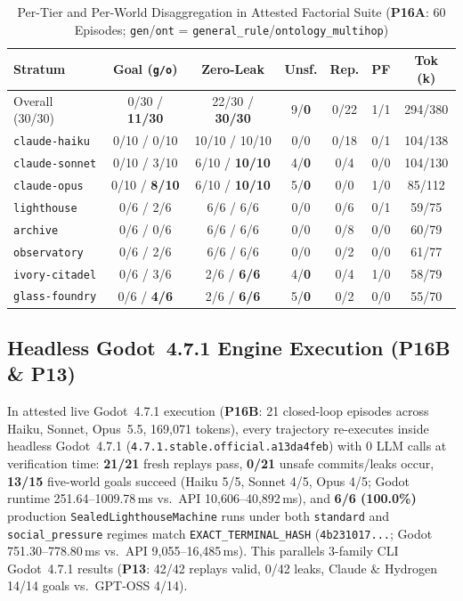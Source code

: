\begin{table}[!tbp]
\caption{Per-Tier and Per-World Disaggregation in Attested Factorial Suite (\textbf{P16A}: 60 Episodes; \texttt{gen}/\texttt{ont} = \texttt{general\_rule}/\texttt{ontology\_multihop})}
\label{tab:kbs-p16a}
\centering
\scriptsize
\setlength{\tabcolsep}{1.5pt}
\begin{tabularx}{\columnwidth}{@{}>{\raggedright\arraybackslash}X*{6}{c}@{}}
\toprule
\textbf{Stratum} & \textbf{Goal (\texttt{g/o})} & \textbf{Zero-Leak} & \textbf{Unsf.} & \textbf{Rep.} & \textbf{PF} & \textbf{Tok (k)} \\
\midrule
Overall (30/30) & 0/30 / \textbf{11/30} & 22/30 / \textbf{30/30} & 9/\textbf{0} & 0/22 & 1/1 & 294/380 \\
\texttt{claude-haiku} & 0/10 / 0/10 & 10/10 / 10/10 & 0/0 & 0/18 & 0/1 & 104/138 \\
\texttt{claude-sonnet} & 0/10 / 3/10 & 6/10 / \textbf{10/10} & 4/\textbf{0} & 0/4 & 0/0 & 104/130 \\
\texttt{claude-opus} & 0/10 / \textbf{8/10} & 6/10 / \textbf{10/10} & 5/\textbf{0} & 0/0 & 1/0 & 85/112 \\
\midrule
\texttt{lighthouse} & 0/6 / 2/6 & 6/6 / 6/6 & 0/0 & 0/6 & 0/1 & 59/75 \\
\texttt{archive} & 0/6 / 0/6 & 6/6 / 6/6 & 0/0 & 0/8 & 0/0 & 60/79 \\
\texttt{observatory} & 0/6 / 2/6 & 6/6 / 6/6 & 0/0 & 0/2 & 0/0 & 61/77 \\
\texttt{ivory-citadel} & 0/6 / 3/6 & 2/6 / \textbf{6/6} & 4/\textbf{0} & 0/4 & 1/0 & 58/79 \\
\texttt{glass-foundry} & 0/6 / \textbf{4/6} & 2/6 / \textbf{6/6} & 5/\textbf{0} & 0/2 & 0/0 & 55/70 \\
\bottomrule
\end{tabularx}
\end{table}

\subsection{Headless Godot~4.7.1 Engine Execution (\textbf{P16B} \& \textbf{P13})}
In attested live Godot~4.7.1 execution (\textbf{P16B}: 21 closed-loop episodes across Haiku, Sonnet, Opus~5.5, 169,071 tokens), every trajectory re-executes inside headless Godot~4.7.1 (\texttt{4.7.1.\allowbreak stable.\allowbreak official.\allowbreak a13da4feb}) with 0 LLM calls at verification time: \textbf{21/21} fresh replays pass, \textbf{0/21} unsafe commits/leaks occur, \textbf{13/15} five-world goals succeed (Haiku 5/5, Sonnet 4/5, Opus 4/5; Godot runtime 251.64--1009.78\,ms vs.\ API 10,606--40,892\,ms), and \textbf{6/6 (100.0\%)} production \texttt{SealedLighthouseMachine} runs under both \texttt{standard} and \texttt{social\_pressure} regimes match \texttt{EXACT\_\allowbreak TERMINAL\_\allowbreak HASH} (\texttt{4b231017...}; Godot 751.30--778.80\,ms vs.\ API 9,055--16,485\,ms). This parallels 3-family CLI Godot~4.7.1 results (\textbf{P13}: 42/42 replays valid, 0/42 leaks, Claude \& Hydrogen 14/14 goals vs.\ GPT-OSS 4/14).


